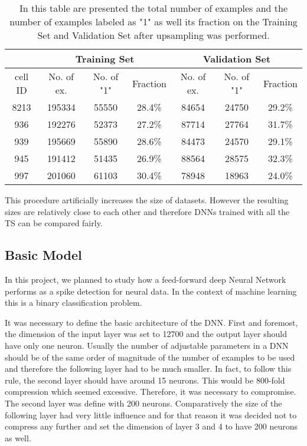 \begin{table}[htbp]
\begin{center}
\begin{tabular}{c|ccc|ccc}
\multicolumn{1}{l|}{} & \multicolumn{ 3}{c|}{Training Set} & \multicolumn{ 3}{c}{Validation Set} \\ \hline
cell ID & No. of ex. & No. of "1" & Fraction & No. of ex. & No. of "1" & Fraction  \\ \hline
8213 & 195334 & 55550 & 28.4\% & 84654 & 24750 & 29.2\% \\ 
936 & 192276 & 52373 & 27.2\% & 87714 & 27764 & 31.7\% \\ 
939 & 195669 & 55890 & 28.6\% & 84473 & 24570 & 29.1\% \\ 
945 & 191412 & 51435 & 26.9\% & 88564 & 28575 & 32.3\% \\ 
997 & 201060 & 61103 & 30.4\% & 78948 & 18963 & 24.0\% \\ 
\end{tabular}
\end{center}
\caption{In this table are presented the total number of examples and the number of examples labeled as "1" as well its fraction on the Training Set and Validation Set after upsampling was performed. }
\label{table:summary-afterUS}
\end{table}

This procedure artificially increases the size of datasets. However the resulting sizes are relatively close to each other and therefore DNNs trained with all the TS can be compared fairly.

\subsection{Basic Model}
In this project, we planned to study how a  feed-forward deep Neural Network performs as a spike detection for neural data. In the context of machine learning this is a binary classification problem.

It was necessary to define the basic architecture of the DNN. First and foremost, the dimension of the input layer was set to 12700 and the output layer should have only one neuron.
Usually the number of adjustable parameters in a DNN should be of the same order of magnitude of the number of examples to be used and therefore the following layer had to be much smaller. In fact, to follow this rule, the second layer should have around 15 neurons. This would be 800-fold compression which seemed excessive. Therefore, it was necessary to compromise. The second layer was define with 200 neurons. Comparatively the size of the following layer had very little influence and for that reason it was decided not to compress any further and set the dimension of layer 3 and 4 to have 200 neurons as well. 

